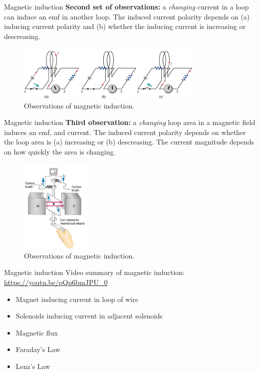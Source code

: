 \documentclass{beamer}
\begin{document}
\begin{frame}{Magnetic induction}
\small
\textbf{\alert{Second set of observations:}} a \textit{changing} current in a loop can induce an emf in another loop.  The induced current polarity depends on (a) inducing current polarity and (b) whether the inducing current is increasing or descreasing.
\begin{figure}
\centering
\includegraphics[width=0.8\textwidth]{figures/farad2.png}
\caption{\label{fig:farad2} Observations of magnetic induction.}
\end{figure}
\end{frame}

\begin{frame}{Magnetic induction}
\small
\textbf{\alert{Third observation:}} a \textit{changing} loop area in a magnetic field induces an emf, and current.  The induced current polarity depends on whether the loop area is (a) increasing or (b) descreasing.  The current magnitude depends on how quickly the area is changing.
\begin{figure}
\centering
\includegraphics[width=0.3\textwidth]{figures/motorz.png}
\caption{\label{fig:motorz} Observations of magnetic induction.}
\end{figure}
\end{frame}

\begin{frame}{Magnetic induction}
Video summary of magnetic induction: \\
\url{https://youtu.be/pQp6bmJPU_0}
\begin{itemize}
\item Magnet inducing current in loop of wire
\item Solenoids inducing current in adjacent solenoids
\item Magnetic flux
\item Faraday's Law
\item Lenz's Law
\end{itemize}
\end{frame}
\end{document}
